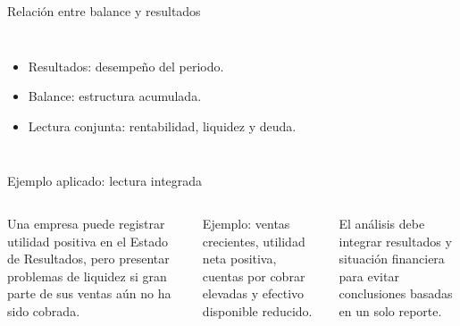 \begin{frame}{Relación entre balance y resultados}
  \begin{columns}[T,onlytextwidth]
    \begin{itemize}
      \item Resultados: desempeño del periodo.
      \item Balance: estructura acumulada.
      \item Lectura conjunta: rentabilidad, liquidez y deuda.
    \end{itemize}
  \end{columns}
\end{frame}

\begin{frame}{Ejemplo aplicado: lectura integrada}
  \begin{columns}[T,onlytextwidth]
    \footnotesize
    Una empresa puede registrar utilidad positiva en el Estado de Resultados, pero presentar problemas de liquidez si gran parte de sus ventas aún no ha sido cobrada.

    \vspace{0.5em}
    Ejemplo: ventas crecientes, utilidad neta positiva, cuentas por cobrar elevadas y efectivo disponible reducido.

    \vspace{0.5em}
    El análisis debe integrar resultados y situación financiera para evitar conclusiones basadas en un solo reporte.
  \end{columns}
\end{frame}
